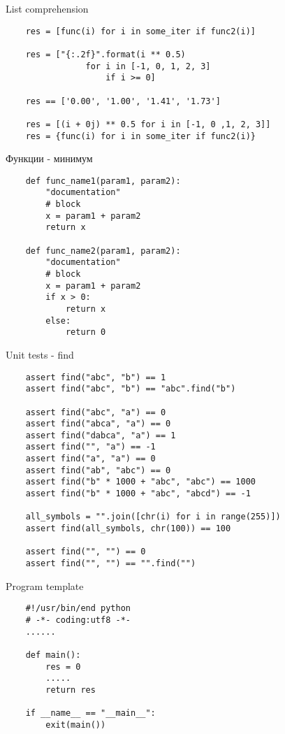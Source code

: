 \documentclass{article}
\begin{document}
\begin{center} List comprehension \end{center}
\vspace{15pt}
\begin{lstlisting}
	res = [func(i) for i in some_iter if func2(i)]

	res = ["{:.2f}".format(i ** 0.5) 
				for i in [-1, 0, 1, 2, 3] 
					if i >= 0]
	
	res == ['0.00', '1.00', '1.41', '1.73']

	res = [(i + 0j) ** 0.5 for i in [-1, 0 ,1, 2, 3]]
	res = {func(i) for i in some_iter if func2(i)}
\end{lstlisting}
\newpage

\begin{center} Функции - минимум \end{center}
\begin{lstlisting}
	def func_name1(param1, param2):
		"documentation"
		# block
		x = param1 + param2
		return x

	def func_name2(param1, param2):
		"documentation"
		# block
		x = param1 + param2
		if x > 0:
			return x
		else:
			return 0
\end{lstlisting}
\newpage

\begin{center} Unit tests - find \end{center}
\begin{lstlisting}
	assert find("abc", "b") == 1
	assert find("abc", "b") == "abc".find("b")

	assert find("abc", "a") == 0
	assert find("abca", "a") == 0
	assert find("dabca", "a") == 1
	assert find("", "a") == -1
	assert find("a", "a") == 0
	assert find("ab", "abc") == 0
	assert find("b" * 1000 + "abc", "abc") == 1000
	assert find("b" * 1000 + "abc", "abcd") == -1

	all_symbols = "".join([chr(i) for i in range(255)])
	assert find(all_symbols, chr(100)) == 100

	assert find("", "") == 0
	assert find("", "") == "".find("")
\end{lstlisting}
\newpage
\begin{center} Program template \end{center}
\begin{lstlisting}
	#!/usr/bin/end python
	# -*- coding:utf8 -*-
	......

	def main():
		res = 0
		.....
		return res

	if __name__ == "__main__":
		exit(main())
\end{lstlisting}
\newpage

\end{document}
